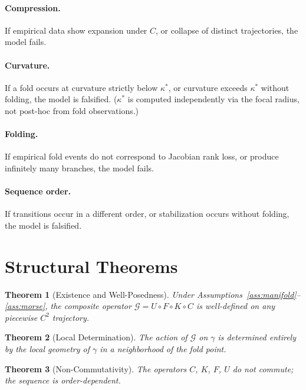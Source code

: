 \documentclass[12pt, oneside]{book}
\theoremstyle{plain}
\newtheorem{theorem}{Theorem}[section]
\theoremstyle{definition}
\theoremstyle{remark}
\begin{document}
\paragraph{Compression.}
If empirical data show expansion under $C$, or collapse of distinct
trajectories, the model fails.

\paragraph{Curvature.}
If a fold occurs at curvature strictly below $\kappa^*$, or curvature
exceeds $\kappa^*$ without folding, the model is falsified. ($\kappa^*$
is computed independently via the focal radius, not post-hoc from fold
observations.)

\paragraph{Folding.}
If empirical fold events do not correspond to Jacobian rank loss, or
produce infinitely many branches, the model fails.

\paragraph{Sequence order.}
If transitions occur in a different order, or stabilization occurs
without folding, the model is falsified.

\section{Structural Theorems}

\begin{theorem}[Existence and Well-Posedness]
Under Assumptions~\ref{ass:manifold}--\ref{ass:morse}, the composite
operator $\mathcal{G} = U \circ F \circ K \circ C$ is well-defined on
any piecewise $C^2$ trajectory.
\end{theorem}

\begin{theorem}[Local Determination]
The action of $\mathcal{G}$ on $\gamma$ is determined entirely by the
local geometry of $\gamma$ in a neighborhood of the fold point.
\end{theorem}

\begin{theorem}[Non-Commutativity]
The operators $C$, $K$, $F$, $U$ do not commute; the sequence is
order-dependent.
\end{theorem}
\end{document}
